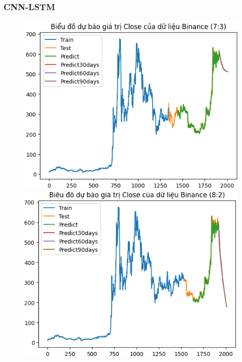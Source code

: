 \documentclass[conference]{IEEEtran}
\begin{document}
	\subsubsection{CNN-LSTM}
	\begin{figure}[H]
		\centering
		\begin{minipage}{0.15\textwidth}
			\centering
			\includegraphics[width=1\textwidth]{Figure/RNN_BNB73.png}
		\end{minipage}
		\hfill
		\begin{minipage}{0.15\textwidth}
			\centering
			\includegraphics[width=1\textwidth]{Figure/RNN_BNB82.png}
		\end{minipage}

\end{figure}
\end{document}
